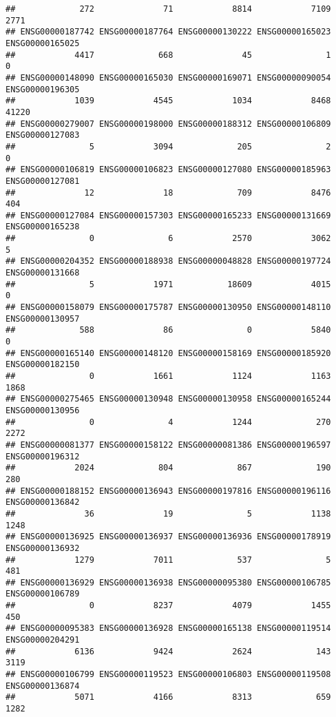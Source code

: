 \documentclass[
]{article}
\begin{document}
\begin{verbatim}
##             272              71            8814            7109            2771 
## ENSG00000187742 ENSG00000187764 ENSG00000130222 ENSG00000165023 ENSG00000165025 
##            4417             668              45               1               0 
## ENSG00000148090 ENSG00000165030 ENSG00000169071 ENSG00000090054 ENSG00000196305 
##            1039            4545            1034            8468           41220 
## ENSG00000279007 ENSG00000198000 ENSG00000188312 ENSG00000106809 ENSG00000127083 
##               5            3094             205               2               0 
## ENSG00000106819 ENSG00000106823 ENSG00000127080 ENSG00000185963 ENSG00000127081 
##              12              18             709            8476             404 
## ENSG00000127084 ENSG00000157303 ENSG00000165233 ENSG00000131669 ENSG00000165238 
##               0               6            2570            3062               5 
## ENSG00000204352 ENSG00000188938 ENSG00000048828 ENSG00000197724 ENSG00000131668 
##               5            1971           18609            4015               0 
## ENSG00000158079 ENSG00000175787 ENSG00000130950 ENSG00000148110 ENSG00000130957 
##             588              86               0            5840               0 
## ENSG00000165140 ENSG00000148120 ENSG00000158169 ENSG00000185920 ENSG00000182150 
##               0            1661            1124            1163            1868 
## ENSG00000275465 ENSG00000130948 ENSG00000130958 ENSG00000165244 ENSG00000130956 
##               0               4            1244             270            2272 
## ENSG00000081377 ENSG00000158122 ENSG00000081386 ENSG00000196597 ENSG00000196312 
##            2024             804             867             190             280 
## ENSG00000188152 ENSG00000136943 ENSG00000197816 ENSG00000196116 ENSG00000136842 
##              36              19               5            1138            1248 
## ENSG00000136925 ENSG00000136937 ENSG00000136936 ENSG00000178919 ENSG00000136932 
##            1279            7011             537               5             481 
## ENSG00000136929 ENSG00000136938 ENSG00000095380 ENSG00000106785 ENSG00000106789 
##               0            8237            4079            1455             450 
## ENSG00000095383 ENSG00000136928 ENSG00000165138 ENSG00000119514 ENSG00000204291 
##            6136            9424            2624             143            3119 
## ENSG00000106799 ENSG00000119523 ENSG00000106803 ENSG00000119508 ENSG00000136874 
##            5071            4166            8313             659            1282 

\end{verbatim}
\end{document}
